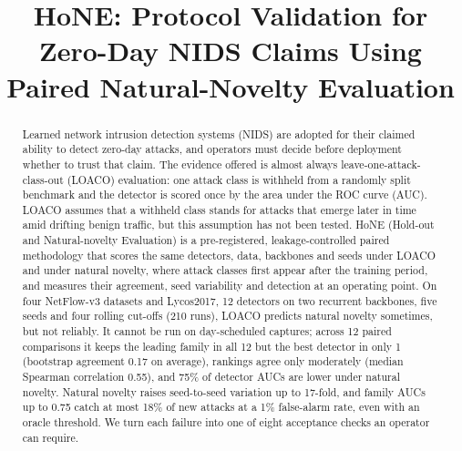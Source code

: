\documentclass[conference]{IEEEtran}
\newif\ifanonymous
\begin{document}
\newcommand{\obs}[1]{\refstepcounter{obs}\par\smallskip\noindent\fcolorbox{obsframe}{obsfill}{\parbox{\dimexpr\columnwidth-2\fboxsep-2\fboxrule\relax}{\textbf{Observation O\theobs.} #1}}\par\smallskip}

\title{HoNE: Protocol Validation for Zero-Day NIDS Claims Using Paired Natural-Novelty Evaluation}

\ifanonymous
\author{\IEEEauthorblockN{Anonymous Author(s)}\IEEEauthorblockA{Submission under double-blind review}}
\else
\author{
}
\fi

\maketitle

\begin{abstract}
Learned network intrusion detection systems (NIDS) are adopted for their claimed ability to detect zero-day attacks, and operators must decide before deployment whether to trust that claim. The evidence offered is almost always leave-one-attack-class-out (LOACO) evaluation: one attack class is withheld from a randomly split benchmark and the detector is scored once by the area under the ROC curve (AUC). LOACO assumes that a withheld class stands for attacks that emerge later in time amid drifting benign traffic, but this assumption has not been tested. HoNE (Hold-out and Natural-novelty Evaluation) is a pre-registered, leakage-controlled paired methodology that scores the same detectors, data, backbones and seeds under LOACO and under natural novelty, where attack classes first appear after the training period, and measures their agreement, seed variability and detection at an operating point. On four NetFlow-v3 datasets and Lycos2017, 12 detectors on two recurrent backbones, five seeds and four rolling cut-offs (210 runs), LOACO predicts natural novelty sometimes, but not reliably. It cannot be run on day-scheduled captures; across 12 paired comparisons it keeps the leading family in all 12 but the best detector in only 1 (bootstrap agreement 0.17 on average), rankings agree only moderately (median Spearman correlation 0.55), and 75\% of detector AUCs are lower under natural novelty. Natural novelty raises seed-to-seed variation up to 17-fold, and family AUCs up to 0.75 catch at most 18\% of new attacks at a 1\% false-alarm rate, even with an oracle threshold. We turn each failure into one of eight acceptance checks an operator can require.
\end{abstract}
\end{document}
